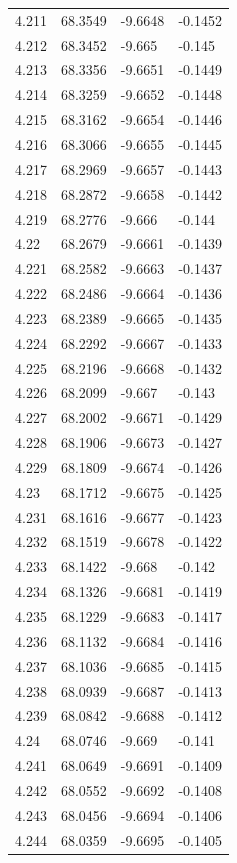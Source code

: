 \begin{tabular}{llll}
4.211 & 68.3549 & -9.6648 & -0.1452 \\
4.212 & 68.3452 & -9.665 & -0.145 \\
4.213 & 68.3356 & -9.6651 & -0.1449 \\
4.214 & 68.3259 & -9.6652 & -0.1448 \\
4.215 & 68.3162 & -9.6654 & -0.1446 \\
4.216 & 68.3066 & -9.6655 & -0.1445 \\
4.217 & 68.2969 & -9.6657 & -0.1443 \\
4.218 & 68.2872 & -9.6658 & -0.1442 \\
4.219 & 68.2776 & -9.666 & -0.144 \\
4.22 & 68.2679 & -9.6661 & -0.1439 \\
4.221 & 68.2582 & -9.6663 & -0.1437 \\
4.222 & 68.2486 & -9.6664 & -0.1436 \\
4.223 & 68.2389 & -9.6665 & -0.1435 \\
4.224 & 68.2292 & -9.6667 & -0.1433 \\
4.225 & 68.2196 & -9.6668 & -0.1432 \\
4.226 & 68.2099 & -9.667 & -0.143 \\
4.227 & 68.2002 & -9.6671 & -0.1429 \\
4.228 & 68.1906 & -9.6673 & -0.1427 \\
4.229 & 68.1809 & -9.6674 & -0.1426 \\
4.23 & 68.1712 & -9.6675 & -0.1425 \\
4.231 & 68.1616 & -9.6677 & -0.1423 \\
4.232 & 68.1519 & -9.6678 & -0.1422 \\
4.233 & 68.1422 & -9.668 & -0.142 \\
4.234 & 68.1326 & -9.6681 & -0.1419 \\
4.235 & 68.1229 & -9.6683 & -0.1417 \\
4.236 & 68.1132 & -9.6684 & -0.1416 \\
4.237 & 68.1036 & -9.6685 & -0.1415 \\
4.238 & 68.0939 & -9.6687 & -0.1413 \\
4.239 & 68.0842 & -9.6688 & -0.1412 \\
4.24 & 68.0746 & -9.669 & -0.141 \\
4.241 & 68.0649 & -9.6691 & -0.1409 \\
4.242 & 68.0552 & -9.6692 & -0.1408 \\
4.243 & 68.0456 & -9.6694 & -0.1406 \\
4.244 & 68.0359 & -9.6695 & -0.1405 \\

\end{tabular}
